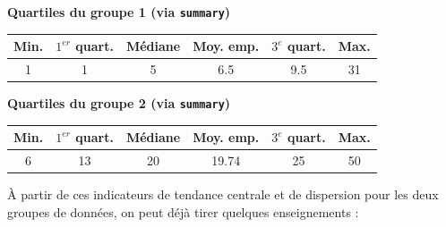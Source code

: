 \documentclass[a4paper,11pt]{article}
\theoremstyle{nonumberplain}
\theoremstyle{nonumberplain}
\theoremstyle{nonumberplain}
\theoremstyle{nonumberplain}
\begin{document}
\begin{center}
        \bigskip
        \medskip
        \textbf{Quartiles du groupe 1 (via \texttt{summary})}
        \medskip
        \begin{tabular}{|c|c|c|c|c|c|}
            \hline
            \textbf{Min.} & \textbf{$1^{er}$ quart.} & \textbf{Médiane} & \textbf{Moy. emp.} & \textbf{$3^e$ quart.} & \textbf{Max.} \\
            \hline
                \hspace{3ex}1\hspace{3ex} & \hspace{3ex}1\hspace{3ex} & \hspace{3ex}5\hspace{3ex} & \hspace{3ex}6.5\hspace{3ex} & \hspace{3ex}9.5\hspace{3ex} & \hspace{3ex}31\hspace{3ex} \\
            \hline
        \end{tabular}

        \bigskip
        \medskip
        \textbf{Quartiles du groupe 2 (via \texttt{summary})}
        \medskip
        \begin{tabular}{|c|c|c|c|c|c|}
            \hline
            \textbf{Min.} & \textbf{$1^{er}$ quart.} & \textbf{Médiane} & \textbf{Moy. emp.} & \textbf{$3^e$ quart.} & \textbf{Max.} \\
            \hline
                \hspace{3ex}6\hspace{3ex} & \hspace{3ex}13\hspace{3ex} & \hspace{3ex}20\hspace{3ex} & \hspace{3ex}19.74\hspace{3ex} & \hspace{3ex}25\hspace{3ex} & \hspace{3ex}50\hspace{3ex} \\
            \hline
        \end{tabular}
      \end{center}

      \medskip
      \`{A} partir de ces indicateurs de tendance centrale et de dispersion pour
      les deux groupes de données, on peut déjà tirer quelques enseignements :
\end{document}
